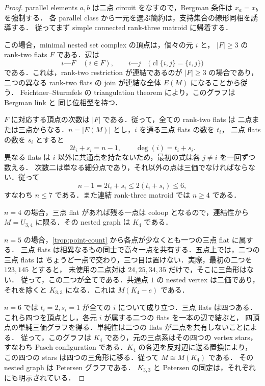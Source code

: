 \begin{proof}
parallel elements $a,b$ は二点 circuit をなすので，Bergman 条件は $x_a=x_b$ を強制する．
各 parallel class から一元を選ぶ簡約は，支持集合の線形同相を誘導する．
従ってまず simple connected rank-three matroid に帰着する．

この場合，minimal nested set complex の頂点は，個々の元 $i$ と，
$|F|\geq3$ の rank-two flats $F$ である．辺は
\[
 i\text{---}F\quad(i\in F),\qquad
 i\text{---}j\quad\bigl(\operatorname{cl}\{i,j\}=\{i,j\}\bigr)
\]
である．これは，rank-two restriction が連結であるのが $|F|\geq3$ の場合であり，
二つの異なる rank-two flats の join が連結な全体 $E(M)$ になることから従う．
Feichtner--Sturmfels の triangulation theorem により，このグラフは Bergman link と
同じ位相型を持つ\cite[Theorem 4.1]{FeichtnerSturmfels}．

$F$ に対応する頂点の次数は $|F|$ である．従って，全ての rank-two flats は
二点または三点からなる．$n=|E(M)|$ とし，$i$ を通る三点 flats の数を $t_i$，
二点 flats の数を $s_i$ とすると
\begin{equation}\label{trop:point-count}
 2t_i+s_i=n-1,\qquad \deg(i)=t_i+s_i.
\end{equation}
異なる flats は $i$ 以外に共通点を持たないため，最初の式は各 $j\ne i$ を一回ずつ数える．
次数二は単なる細分点であり，それ以外の点は三価でなければならない．従って
\[
 n-1=2t_i+s_i\leq2(t_i+s_i)\leq6,
\]
すなわち $n\leq7$ である．また連結 rank-three matroid では $n\geq4$ である．

$n=4$ の場合，三点 flat があれば残る一点は coloop となるので，連結性から
$M=U_{3,4}$ に限る．その nested graph は $K_4$ である．

$n=5$ の場合，\eqref{trop:point-count} から各点が少なくとも一つの三点 flat に属する．
三点 flats は相異なるもの同士で高々一点を共有する．五点上では，二つの三点 flats は
ちょうど一点で交わり，三つ目は置けない．実際，最初の二つを $123,145$ とすると，
未使用の二点対は $24,25,34,35$ だけで，そこに三角形はない．
従って，この二つが全てである．共通点 $1$ の nested vertex は二価であり，
それを除くと $K_{3,3}$ になる．これは $M(K_4-e)$ である．

$n=6$ では $t_i=2,s_i=1$ が全ての $i$ について成り立つ．三点 flats は四つある．
これら四つを頂点とし，各元 $i$ が属する二つの flats を一本の辺で結ぶと，
四頂点の単純三価グラフを得る．単純性は二つの flats が二点を共有しないことによる．
従って，このグラフは $K_4$ であり，元の三点系はその四つの vertex stars，
すなわち Pasch configuration である．$K_4$ の各辺を反対辺に送る置換により，
この四つの stars は四つの三角形に移る．従って $M\cong M(K_4)$ である．
その nested graph は Petersen グラフである．
$K_{3,3}$ と Petersen の同定は，それぞれ
\cite[Examples 1.2 and 1.1]{FeichtnerSturmfels} にも明示されている．


\end{proof}
